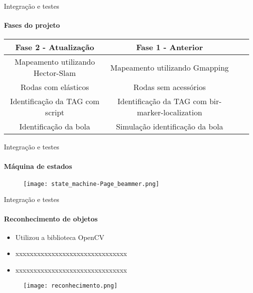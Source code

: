 \begin{frame}[t]{Integração e testes}
    \framesubtitle{Fases do projeto}
    \begin{table}[ht!]
        \centering
            \begin{tabular}{|c|c|c|c|} \hline
                \textbf{Fase 2 - Atualização }&\textbf{Fase 1 - Anterior}\\\hline
                Mapeamento utilizando Hector-Slam & Mapeamento utilizando Gmapping \\ \hline
                Rodas com elásticos & Rodas sem acessórios \\ \hline
                Identificação da TAG com script & Identificação da TAG com bir-marker-localization \\ \hline
                Identificação da bola  & Simulação identificação da bola\\ \hline
            \end{tabular}
        \end{table}
\end{frame}

\begin{frame}[t]{Integração e testes}
    \framesubtitle{Máquina de estados}
    \begin{figure}
        \texttt{[image: state\_machine-Page\_beammer.png]}
    \end{figure}
\end{frame}

\begin{frame}[t]{Integração e testes}
    \framesubtitle{Reconhecimento de objetos}
    \begin{itemize}
        \item Utilizou a biblioteca OpenCV
        \item xxxxxxxxxxxxxxxxxxxxxxxxxxxxxxx
        \item xxxxxxxxxxxxxxxxxxxxxxxxxxxxxxx
    \end{itemize}
    \vspace*{0.4cm}
    \begin{figure}
        \texttt{[image: reconhecimento.png]}
    \end{figure}
\end{frame}

